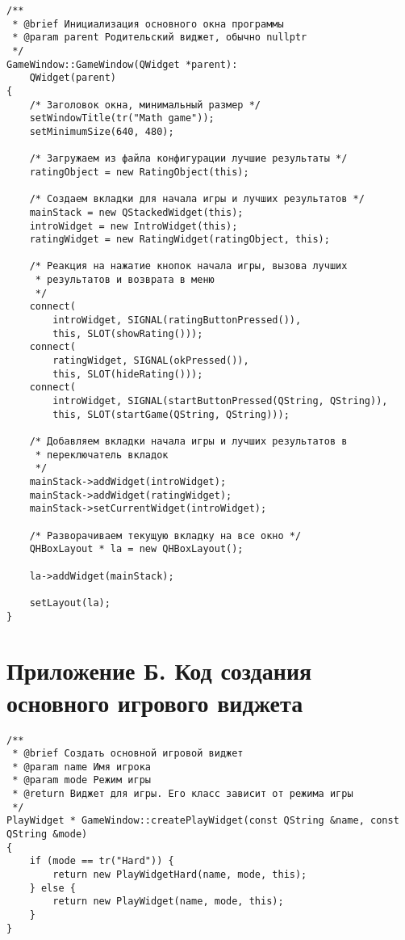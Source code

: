 \documentclass[a4paper,12pt]{article}
\begin{document}
\begin{verbatim}
/**
 * @brief Инициализация основного окна программы
 * @param parent Родительский виджет, обычно nullptr
 */
GameWindow::GameWindow(QWidget *parent):
    QWidget(parent)
{
    /* Заголовок окна, минимальный размер */
    setWindowTitle(tr("Math game"));
    setMinimumSize(640, 480);

    /* Загружаем из файла конфигурации лучшие результаты */
    ratingObject = new RatingObject(this);

    /* Создаем вкладки для начала игры и лучших результатов */
    mainStack = new QStackedWidget(this);
    introWidget = new IntroWidget(this);
    ratingWidget = new RatingWidget(ratingObject, this);

    /* Реакция на нажатие кнопок начала игры, вызова лучших
     * результатов и возврата в меню
     */
    connect(
    	introWidget, SIGNAL(ratingButtonPressed()),
    	this, SLOT(showRating()));
    connect(
    	ratingWidget, SIGNAL(okPressed()),
    	this, SLOT(hideRating()));
    connect(
    	introWidget, SIGNAL(startButtonPressed(QString, QString)),
    	this, SLOT(startGame(QString, QString)));

    /* Добавляем вкладки начала игры и лучших результатов в
     * переключатель вкладок
     */
    mainStack->addWidget(introWidget);
    mainStack->addWidget(ratingWidget);
    mainStack->setCurrentWidget(introWidget);

    /* Разворачиваем текущую вкладку на все окно */
    QHBoxLayout * la = new QHBoxLayout();

    la->addWidget(mainStack);

    setLayout(la);
}
\end{verbatim}


\section*{Приложение Б. Код создания основного игрового виджета}

\begin{verbatim}
/**
 * @brief Создать основной игровой виджет
 * @param name Имя игрока
 * @param mode Режим игры
 * @return Виджет для игры. Его класс зависит от режима игры
 */
PlayWidget * GameWindow::createPlayWidget(const QString &name, const QString &mode)
{
    if (mode == tr("Hard")) {
        return new PlayWidgetHard(name, mode, this);
    } else {
        return new PlayWidget(name, mode, this);
    }
}
\end{verbatim}


\end{document}

